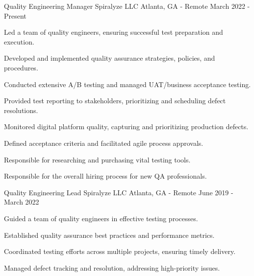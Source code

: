 

\begin{cventries}

  \cventry
    {Quality Engineering Manager} %
    {Spiralyze LLC} %
    {Atlanta, GA - Remote} %
    {March 2022 - Present} %
    {
      \begin{cvitems} %
        \item {Led a team of quality engineers, ensuring successful test preparation and execution.}
        \item {Developed and implemented quality assurance strategies, policies, and procedures.}
        \item {Conducted extensive A/B testing and managed UAT/business acceptance testing.}
        \item {Provided test reporting to stakeholders, prioritizing and scheduling defect resolutions.}
        \item {Monitored digital platform quality, capturing and prioritizing production defects.}
        \item {Defined acceptance criteria and facilitated agile process approvals.}
        \item {Responsible for researching and purchasing vital testing tools.}
        \item {Responsible for the overall hiring process for new QA professionals.}
      \end{cvitems}
    }

  \cventry
    {Quality Engineering Lead} %
    {Spiralyze LLC} %
    {Atlanta, GA - Remote} %
    {June 2019 - March 2022} %
    {
      \begin{cvitems} %
        \item {Guided a team of quality engineers in effective testing processes.}
        \item {Established quality assurance best practices and performance metrics.}
        \item {Coordinated testing efforts across multiple projects, ensuring timely delivery.}
        \item {Managed defect tracking and resolution, addressing high-priority issues.}
      \end{cvitems}
    }


\end{cventries}
